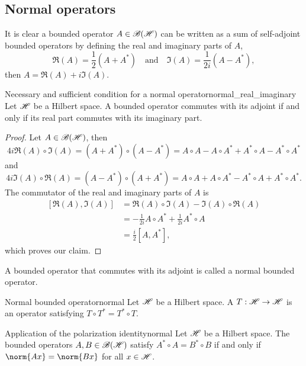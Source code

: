 \subsection{Normal operators}
It is clear a bounded operator \(A \in \mathscr{B}(\mathscr{H})\) can be written as a sum of self-adjoint bounded operators by defining the real and imaginary parts of \(A\),
\begin{equation*}
    \Re{(A)} = \frac{1}{2}\left(A + A^*\right)
    \quad\text{and}\quad
    \Im{(A)} = \frac{1}{2i}\left(A - A^*\right),
\end{equation*}
then \(A = \Re{(A)} + i\Im{(A)}\).
\begin{proposition}{Necessary and sufficient condition for a normal operator}{normal_real_imaginary}
    Let \(\mathscr{H}\) be a Hilbert space. A bounded operator commutes with its adjoint if and only if its real part commutes with its imaginary part.
\end{proposition}
\begin{proof}
    Let \(A \in \mathscr{B}(\mathscr{H})\), then
    \begin{equation*}
        4i\Re(A)\circ \Im(A) = (A + A^*) \circ (A - A^*) = A\circ A - A\circ A^* + A^* \circ A - A^* \circ A^*
    \end{equation*}
    and
    \begin{equation*}
        4i\Im(A)\circ \Re(A) = (A - A^*) \circ (A + A^*) = A\circ A + A\circ A^* - A^* \circ A + A^* \circ A^*.
    \end{equation*}
    The commutator of the real and imaginary parts of \(A\) is
    \begin{align*}
        \left[\Re(A), \Im(A)\right] &= \Re(A)\circ \Im(A) - \Im(A)\circ \Re(A)\\
                                    &= - \frac1{2i} A\circ A^* + \frac{1}{2i} A^* \circ A\\
                                    &= \frac{i}{2} [A, A^*],
    \end{align*}
    which proves our claim.
\end{proof}
A bounded operator that commutes with its adjoint is called a normal bounded operator.
\begin{definition}{Normal bounded operator}{normal}
    Let \(\mathscr{H}\) be a Hilbert space. A  \(T : \mathscr{H} \to \mathscr{H}\) is an operator satisfying \(T \circ T^* = T^* \circ T\).
\end{definition}
\begin{lemma}{Application of the polarization identity}{normal}
    Let \(\mathscr{H}\) be a Hilbert space. The bounded operators \(A, B \in \mathscr{B}(\mathscr{H})\) satisfy \(A^* \circ A = B^*\circ B\) if and only if \(\norm{Ax} = \norm{Bx}\) for all \(x \in \mathscr{H}\).
\end{lemma}
